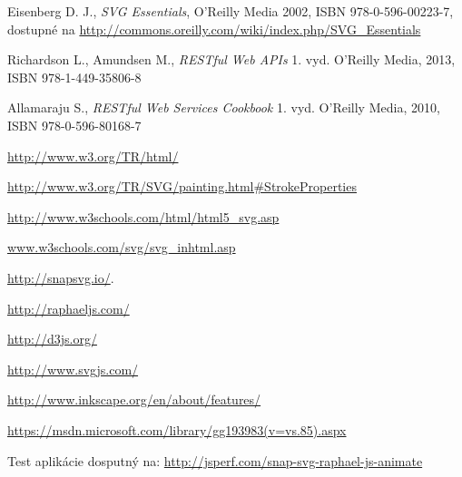 \begin{thebibliography}{99}
Eisenberg D. J., {\it SVG Essentials}, 
O'Reilly Media 2002, ISBN  978-0-596-00223-7,  dostupné na \url{http://commons.oreilly.com/wiki/index.php/SVG_Essentials}

Richardson L., Amundsen M., {\it RESTful Web APIs} 
1. vyd. O'Reilly Media, 2013, 
ISBN 978-1-449-35806-8

Allamaraju S., {\it RESTful Web Services Cookbook} 
1. vyd. O'Reilly Media, 2010, 
ISBN 978-0-596-80168-7





\url{http://www.w3.org/TR/html/}

\url{http://www.w3.org/TR/SVG/painting.html#StrokeProperties}

\url{ http://www.w3schools.com/html/html5_svg.asp}

\url{www.w3schools.com/svg/svg_inhtml.asp}


\url{http://snapsvg.io/}.


\url{ http://raphaeljs.com/}

\url {http://d3js.org/}

 
 \url{http://www.svgjs.com/}


\url {http://www.inkscape.org/en/about/features/}


\url{https://msdn.microsoft.com/library/gg193983(v=vs.85).aspx}

Test aplikácie dosputný na:  \url{http://jsperf.com/snap-svg-raphael-js-animate}


\end{thebibliography}